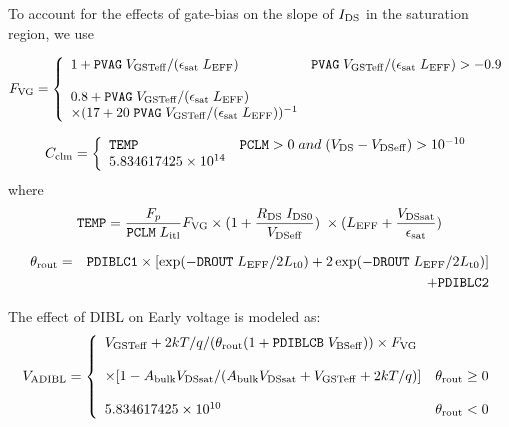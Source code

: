 \documentclass{article}
\begin{document}
\noindent To account for the effects of gate-bias on the slope of
$I_{\rm{DS}}$ in the saturation region, we use

\begin{equation}
F_{\rm{VG}} = \left\{\begin{array}{ll}
       1 + \texttt{PVAG} \; V_{\rm{GSTeff}} / (\epsilon_{\rm{sat}}\;L_{\rm{EFF}}) & \texttt{PVAG} \;V_{\rm{GSTeff}} / (\epsilon_{\rm{sat}}\;L_{\rm{EFF}}) > -0.9 \nonumber \\
       & \\
       0.8 + \texttt{PVAG}\;V_{\rm{GSTeff}} / (\epsilon_{\rm{sat}}\;L_{\rm{EFF}}) & \nonumber \\
       \times (17 + 20\;\texttt{PVAG}\;V_{\rm{GSTeff}} / (\epsilon_{\rm{sat}}\;L_{\rm{EFF}}))^{-1} & \\
                            \end{array}
                    \right.
\end{equation}

\begin{equation}
C_{\rm{clm}} = \left\{\begin{array}{ll}
       \texttt{TEMP} & \texttt{PCLM} > 0 \; and \; (V_{\rm{DS}} - V_{\rm{DSeff}}) > 10^{-10} \\
        5.834617425 \times 10^{14} &
                            \end{array}
                    \right.
\end{equation}
\noindent where
\begin{equation}
\texttt{TEMP} = {F_p \over \texttt{PCLM} \;L_{\rm{itl}}}
F_{\rm{VG}} \times (1 + {R_{\rm{DS}} \;I_{\rm{DS0}} \over
V_{\rm{DSeff}}}) \;\times (L_{\rm{EFF}} + {V_{\rm{DSsat}} \over
\epsilon_{\rm{sat}}})
\end{equation}

\begin{eqnarray}
\theta_{\rm{rout}} & = & \texttt{PDIBLC1} \times
[\exp(-\texttt{DROUT}\; L_{\rm{EFF}}/2L_{\rm{t0}}) +
2\exp(-\texttt{DROUT}\;L_{\rm{EFF}}/2L_{\rm{t0}})] \nonumber \\
                & & + \texttt{PDIBLC2}
\end{eqnarray}

\noindent The effect of DIBL on Early voltage is modeled as:
\begin{equation}
V_{\rm{ADIBL}} = \left\{\begin{array}{ll}
       V_{\rm{GSTeff}} + 2kT/q / (\theta_{\rm{rout}}(1 + \texttt{PDIBLCB}\;V_{\rm{BSeff}})) \times F_{\rm{VG}} &  \\
       & \\
       \times [{1 - A_{\rm{bulk}} V_{\rm{DSsat}} / (A_{\rm{bulk}} V_{\rm{DSsat}} + V_{\rm{GSTeff}} + 2kT/q)}]& \theta_{\rm{rout}} \geq 0 \\
       & \\
       5.834617425 \times 10^{10} & \theta_{\rm{rout}} < 0
                            \end{array}
                    \right.
\end{equation}
\end{document}
